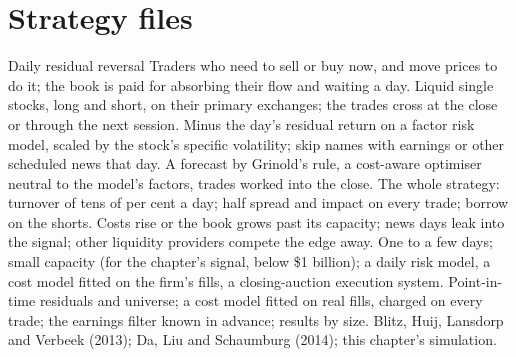 \begin{omfigure}

\label{fig:s1:short-term-reversal:decline}
\end{omfigure}

\section{Strategy files}

\begin{strategyfile}{Daily residual reversal}\label{strat:s1:short-term-reversal:daily}
 Traders who need to sell or buy now, and move prices to do it; the book is paid for absorbing their flow and waiting a day.
 Liquid single stocks, long and short, on their primary exchanges; the trades cross at the close or through the next session.
 Minus the day's residual return on a factor risk model, scaled by the stock's specific volatility; skip names with earnings or other scheduled
news that day.
 A forecast by Grinold's rule, a cost-aware optimiser neutral to the model's factors, trades worked into the close.
 The whole strategy: turnover of tens of per cent a day; half spread and impact on every trade; borrow on the shorts.
 Costs rise or the book grows past its capacity; news days leak into the signal; other liquidity providers compete the edge away.
 One to a few days; small capacity (for the chapter's signal, below \$1 billion); a daily risk model, a cost model
fitted on the firm's fills, a closing-auction execution system.
 Point-in-time residuals and universe; a cost model fitted on real fills, charged on every trade; the earnings filter known in advance;
results by size.
 Blitz, Huij, Lansdorp and Verbeek (2013); Da, Liu and Schaumburg (2014); this chapter's simulation.
\end{strategyfile}

